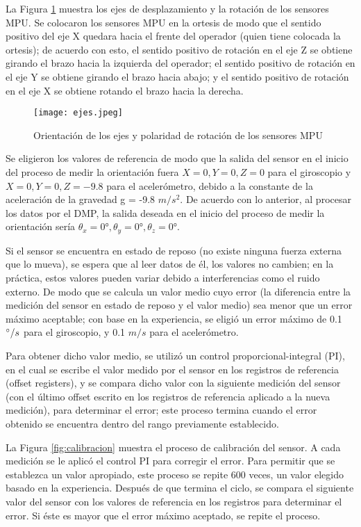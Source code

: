 \newpage
La Figura \ref{fig:ejes} muestra los ejes de desplazamiento y la rotación de los sensores MPU. Se colocaron los sensores MPU en la ortesis de modo que el sentido positivo del eje X quedara hacia el frente del operador (quien tiene colocada la ortesis); de acuerdo con esto, el sentido positivo de rotación en el eje Z se obtiene girando el brazo hacia la izquierda del operador; el sentido positivo de rotación en el eje Y se obtiene girando el brazo hacia abajo; y el sentido positivo de rotación en el eje X se obtiene rotando el brazo hacia la derecha.

\begin{figure}[htb]
	\centering
	\texttt{[image: ejes.jpeg]}
	\caption{Orientación de los ejes y polaridad de rotación de los sensores MPU}
	\label{fig:ejes}
\end{figure}

Se eligieron los valores de referencia de modo que la salida del sensor en el inicio del proceso de medir la orientación fuera $X=0, Y=0, Z=0$ para el giroscopio y $X=0, Y=0, Z=-9.8$ para el acelerómetro, debido a la constante de la aceleración de la gravedad g = -9.8  $m/s^2$. De acuerdo con lo anterior, al procesar los datos por el DMP, la salida deseada en el inicio del proceso de medir la orientación sería $\theta_x = 0°,\theta_y = 0°,\theta_z = 0°$.

Si el sensor se encuentra en estado de reposo (no existe ninguna fuerza externa que lo mueva), se espera que al leer datos de él, los valores no cambien; en la práctica, estos valores pueden variar debido a interferencias como el ruido externo. De modo que se calcula un valor medio cuyo error (la diferencia entre la medición del sensor en estado de reposo y el valor medio) sea menor que un error máximo aceptable; con base en la experiencia, se eligió un error máximo de 0.1 $\degree/s$ para el giroscopio, y 0.1 $m/s$ para el acelerómetro.

Para obtener dicho valor medio, se utilizó un control proporcional-integral (PI), en el cual se escribe el valor medido por el sensor en los registros de referencia (offset registers), y se compara dicho valor con la siguiente medición del sensor (con el último offset escrito en los registros de referencia aplicado a la nueva medición), para determinar el error; este proceso termina cuando el error obtenido se encuentra dentro del rango previamente establecido.

La Figura \ref{fig:calibracion} muestra el proceso de calibración del sensor. A cada medición se le aplicó el control PI para corregir el error. Para permitir que se establezca un valor apropiado, este proceso se repite 600 veces, un valor elegido basado en la experiencia. Después de que termina el ciclo, se compara el siguiente valor del sensor con los valores de referencia en los registros para determinar el error. Si éste es mayor que el error máximo aceptado, se repite el proceso.

